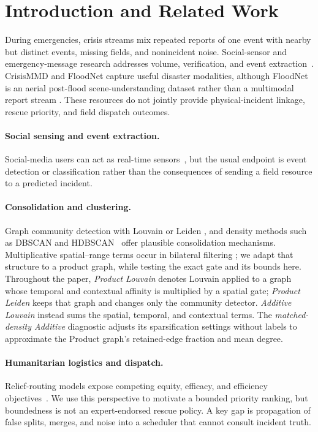 \documentclass[runningheads]{llncs}
\begin{document}
\section{Introduction and Related Work}

During emergencies, crisis streams mix repeated reports of one event with
nearby but distinct events, missing fields, and nonincident noise. Social-sensor
and emergency-message research addresses volume, verification, and event
extraction~\cite{sakaki2010earthquake}. CrisisMMD and FloodNet capture useful
disaster modalities, although FloodNet is an aerial post-flood
scene-understanding dataset rather than a multimodal report stream
\cite{alam2018crisismmd,rahnemoonfar2021floodnet}. These resources do not
jointly provide physical-incident linkage, rescue priority, and field dispatch
outcomes.

\paragraph{Social sensing and event extraction.}
Social-media users can act as real-time sensors~\cite{sakaki2010earthquake},
but the usual endpoint is event detection or classification rather than the
consequences of sending a field resource to a predicted incident.

\paragraph{Consolidation and clustering.}
Graph community detection with Louvain or Leiden
\cite{blondel2008louvain,traag2019leiden}, and density methods such as DBSCAN
and HDBSCAN~\cite{ester1996dbscan} offer plausible consolidation mechanisms.
Multiplicative spatial--range terms occur in bilateral filtering
\cite{tomasi1998bilateral}; we adapt that structure to a product graph, while
testing the exact gate and its bounds here.
Throughout the paper, \emph{Product Louvain} denotes Louvain applied to a
graph whose temporal and contextual affinity is multiplied by a spatial gate;
\emph{Product Leiden} keeps that graph and changes only the community
detector. \emph{Additive Louvain} instead sums the spatial, temporal, and
contextual terms. The \emph{matched-density Additive} diagnostic adjusts its
sparsification settings without labels to approximate the Product graph's
retained-edge fraction and mean degree.

\paragraph{Humanitarian logistics and dispatch.}
Relief-routing models expose competing equity, efficacy, and efficiency
objectives~\cite{gralla2014review}. We use this perspective to motivate a
bounded priority ranking, but boundedness is not an expert-endorsed rescue
policy. A key gap is propagation of false splits, merges, and noise into a
scheduler that cannot consult incident truth.
\end{document}
